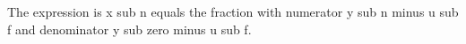 The expression is x sub n equals the fraction with numerator y sub n minus u sub f and denominator y sub zero minus u sub f.